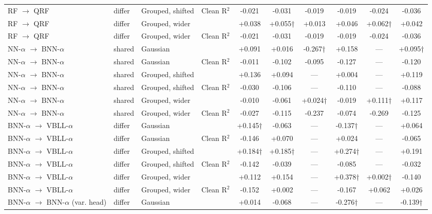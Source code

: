 \begin{landscape}
{\begin{longtable}{llllcccccc}
RF $\rightarrow$ QRF & differ & Grouped, shifted & Clean R$^2$ & -0.021 & -0.031 & -0.019 & -0.019 & -0.024 & -0.036 \\
RF $\rightarrow$ QRF & differ & Grouped, wider & \aucnorm{} & +0.038 & +0.055† & +0.013 & +0.046 & +0.062† & +0.042 \\
RF $\rightarrow$ QRF & differ & Grouped, wider & Clean R$^2$ & -0.021 & -0.031 & -0.019 & -0.019 & -0.024 & -0.036 \\
NN-$\alpha$ $\rightarrow$ BNN-$\alpha$ & shared & Gaussian & \aucnorm{} & +0.091 & +0.016 & -0.267† & +0.158 & --- & +0.095† \\
NN-$\alpha$ $\rightarrow$ BNN-$\alpha$ & shared & Gaussian & Clean R$^2$ & -0.011 & -0.102 & -0.095 & -0.127 & --- & -0.120 \\
NN-$\alpha$ $\rightarrow$ BNN-$\alpha$ & shared & Grouped, shifted & \aucnorm{} & +0.136 & +0.094 & --- & +0.004 & --- & +0.119 \\
NN-$\alpha$ $\rightarrow$ BNN-$\alpha$ & shared & Grouped, shifted & Clean R$^2$ & -0.030 & -0.106 & --- & -0.110 & --- & -0.088 \\
NN-$\alpha$ $\rightarrow$ BNN-$\alpha$ & shared & Grouped, wider & \aucnorm{} & -0.010 & -0.061 & +0.024† & -0.019 & +0.111† & +0.117 \\
NN-$\alpha$ $\rightarrow$ BNN-$\alpha$ & shared & Grouped, wider & Clean R$^2$ & -0.027 & -0.115 & -0.237 & -0.074 & -0.269 & -0.125 \\
BNN-$\alpha$ $\rightarrow$ VBLL-$\alpha$ & differ & Gaussian & \aucnorm{} & +0.145† & -0.063 & --- & -0.137† & --- & +0.064 \\
BNN-$\alpha$ $\rightarrow$ VBLL-$\alpha$ & differ & Gaussian & Clean R$^2$ & -0.146 & +0.070 & --- & +0.024 & --- & -0.065 \\
BNN-$\alpha$ $\rightarrow$ VBLL-$\alpha$ & differ & Grouped, shifted & \aucnorm{} & +0.184† & +0.185† & --- & +0.274† & --- & +0.191 \\
BNN-$\alpha$ $\rightarrow$ VBLL-$\alpha$ & differ & Grouped, shifted & Clean R$^2$ & -0.142 & -0.039 & --- & -0.085 & --- & -0.032 \\
BNN-$\alpha$ $\rightarrow$ VBLL-$\alpha$ & differ & Grouped, wider & \aucnorm{} & +0.112 & +0.154 & --- & +0.378† & +0.002† & -0.140 \\
BNN-$\alpha$ $\rightarrow$ VBLL-$\alpha$ & differ & Grouped, wider & Clean R$^2$ & -0.152 & +0.002 & --- & -0.167 & +0.062 & +0.026 \\
BNN-$\alpha$ $\rightarrow$ BNN-$\alpha$ (var. head) & differ & Gaussian & \aucnorm{} & +0.014 & -0.068 & --- & -0.276† & --- & -0.139† \\

\end{longtable}}
\end{landscape}
